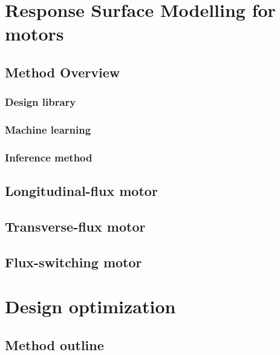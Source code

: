 \section{Response Surface Modelling for motors} \label{Chapter:PMLSM design RSM/RSM for motors}
    \subsection{Method Overview}                \label{Chapter:PMLSM design RSM/RSM for motors/method overview}
        \subsubsection{Design library}          \label{Chapter:PMLSM design RSM/RSM for motors/method overview/design library}
        \subsubsection{Machine learning}        \label{Chapter:PMLSM design RSM/RSM for motors/method overview/machine learning}
        \subsubsection{Inference method}        \label{Chapter:PMLSM design RSM/RSM for motors/method overview/inference method}
    \subsection{Longitudinal-flux motor}        \label{Chapter:PMLSM design RSM/RSM for motors/longitudinal flux}
    \subsection{Transverse-flux motor}          \label{Chapter:PMLSM design RSM/RSM for motors/transverse flux}
    \subsection{Flux-switching motor}           \label{Chapter:PMLSM design RSM/RSM for motors/flux switching}


\section{Design optimization}                   \label{Chapter:PMLSM design RSM/design optimization}
    \subsection{Method outline}                 \label{Chapter:PMLSM design RSM/design optimization/method outline}
